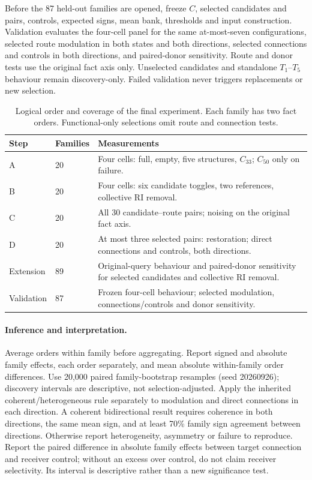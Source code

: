 Before the 87 held-out families are opened, freeze $C$, selected candidates and
pairs, controls, expected signs, mean bank, thresholds and input construction.
Validation evaluates the four-cell panel for the same at-most-seven
configurations, selected route modulation in both states and both directions,
selected connections and controls in both directions, and paired-donor
sensitivity. Route and donor tests use the original fact axis only.
Unselected candidates and standalone $T_1$--$T_5$ behaviour remain discovery-only.
Failed validation never triggers replacements or new selection.

\begin{table}[t]
\centering\small
\setlength{\tabcolsep}{3pt}
\begin{tabular}{@{}p{1.2cm}p{1.25cm}p{4.6cm}@{}}
\toprule
Step & Families & Measurements \\
\midrule
A & 20 & Four cells: full, empty, five structures, $C_{33}$; $C_{50}$ only on failure. \\
B & 20 & Four cells: six candidate toggles, two references, collective RI removal. \\
C & 20 & All 30 candidate--route pairs; noising on the original fact axis. \\
D & 20 & At most three selected pairs: restoration; direct connections and controls, both directions. \\
Extension & 89 & Original-query behaviour and paired-donor sensitivity for selected candidates and collective RI removal. \\
Validation & 87 & Frozen four-cell behaviour; selected modulation, connections/controls and donor sensitivity. \\
\bottomrule
\end{tabular}
\caption{Logical order and coverage of the final experiment. Each family has two
fact orders. Functional-only selections omit route and connection tests.}
\label{tab:final-coverage}
\end{table}

\paragraph{Inference and interpretation.}
Average orders within family before aggregating. Report signed and absolute
family effects, each order separately, and mean absolute within-family order
differences. Use 20,000 paired family-bootstrap resamples (seed 20260926);
discovery intervals are descriptive, not selection-adjusted. Apply the inherited
coherent/heterogeneous rule separately to modulation and direct connections in
each direction. A coherent bidirectional result requires coherence in both
directions, the same mean sign, and at least 70\% family sign agreement between
directions. Otherwise report heterogeneity, asymmetry or failure to reproduce.
Report the paired difference in absolute family effects between target connection
and receiver control; without an excess over control, do not claim receiver
selectivity. Its interval is descriptive rather than a new significance test.

